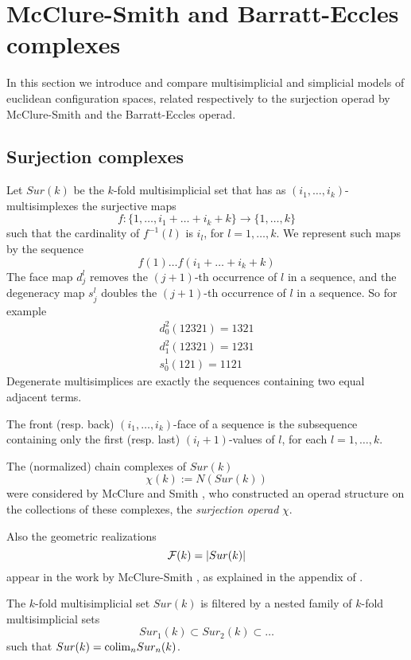 
\section{McClure-Smith and Barratt-Eccles  complexes }

In this section we introduce and compare   multisimplicial and  simplicial  models of euclidean configuration spaces,
related respectively to the surjection operad by McClure-Smith and the Barratt-Eccles operad.

\subsection{Surjection complexes}

\begin{definition}
Let $Sur(k)$  be the $k$-fold multisimplicial set that has
as $(i_1,\dots,i_k)$-multisimplexes
the surjective maps $$f:\{1,\dots,i_1+\dots+i_k+k\} \to  \{1,\dots,k\}$$ such that
the cardinality of $f^{-1}(l)$ is $i_l$, for $l=1,\dots,k$. We represent such maps by the sequence
$$f(1) \dots f(i_1+\dots+i_k+k)$$
The face map
$d^l_j$ removes the $(j+1)$-th occurrence of $l$ in a sequence, and the degeneracy map
$s^l_j$ doubles the $(j+1)$-th occurrence of $l$ in a sequence.
So for example
\begin{align*}d^2_0(12321)=1321 \\ d^2_1(12321)=1231 \\ s^1_0(121)=1121
\end{align*}
Degenerate multisimplices are exactly the sequences containing two equal adjacent terms.

The front  (resp. back) $(i_1,\dots,i_k)$-face of a sequence is the subsequence containing only the first (resp. last)
$(i_l+1)$-values of $l$, for each
$l=1,\dots,k$.
\end{definition}


The (normalized) chain complexes
of $Sur(k)$  $$\chi(k):=N(Sur(k))$$
were considered by McClure and Smith
\cite{MS},
who constructed an operad structure
on the collections of these complexes, the {\it surjection operad} $\chi$.


Also the geometric realizations
$$\mathcal{F}(k)=\lvert Sur(k)\rvert$$ appear in the work by McClure-Smith \cite{MS}, as explained in the appendix of \cite{Deligne}.

The $k$-fold multisimplicial set $Sur(k)$ is filtered
by a nested family of $k$-fold multisimplicial sets
$$Sur_1(k) \subset Sur_2(k)  \subset \dots $$ such that $Sur(k) = {\rm colim}_n Sur_n(k)$.

